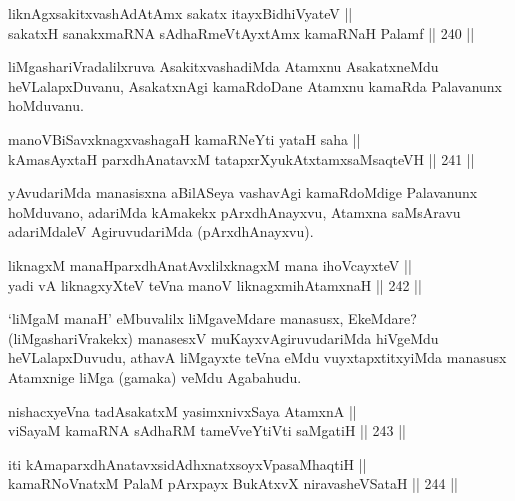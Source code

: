 \begin{shl}
liknAgxsakitxvashAdAtAmx sakatx itayxBidhiVyateV || \\
sakatxH sanakxmaRNA sAdhaRmeVtAyxtAmx kamaRNaH Palamf \hfill || 240 ||  
\end{shl}

\begin{artha}
liMgashariVradalilxruva AsakitxvashadiMda Atamxnu AsakatxneMdu\break
heVLalapxDuvanu, AsakatxnAgi kamaRdoDane Atamxnu kamaRda Palavanunx
hoMduvanu.
\end{artha}

\begin{shl}
manoVBiSavxknagxvashagaH kamaRNeYti yataH saha || \\
kAmasAyxtaH parxdhAnatavxM tatapxrXyukAtxtamxsaMsaqteVH \hfill || 241 ||  
\end{shl}

\begin{artha}
yAvudariMda manasisxna aBilASeya vashavAgi kamaRdoMdige
Palavanunx hoMduvano, adariMda kAmakekx pArxdhAnayxvu, Atamxna
saMsAravu adariMdaleV AgiruvudariMda (pArxdhAnayxvu).
\end{artha}


\begin{shl}
liknagxM manaHparxdhAnatAvxlilxknagxM mana ihoVcayxteV || \\
yadi vA liknagxyXteV teVna manoV liknagxmihA\s \s tamxnaH \hfill || 242 ||  
\end{shl}

\begin{artha}
`liMgaM manaH' eMbuvalilx liMgaveMdare manasusx, EkeMdare?
(liMgashariVrakekx) manasesxV muKayxvAgiruvudariMda hiVgeMdu\break
heVLalapxDuvudu, athavA liMgayxte teVna eMdu vuyxtapxtitxyiMda
manasusx Atamxnige liMga (gamaka) veMdu Agabahudu.
\end{artha}

\begin{shl}
nishacxyeVna tadAsakatxM yasimxnivxSaya AtamxnA || \\
viSayaM kamaRNA sAdhaRM tameVveYtiVti saMgatiH \hfill || 243 ||  
\end{shl}

\begin{shl}
iti kAmaparxdhAnatavxsidAdhxnatxsoyxVpasaMhaqtiH || \\
kamaRNoV\s natxM PalaM pArxpayx BukAtxvX niravasheVSataH \hfill || 244 ||  
\end{shl}


